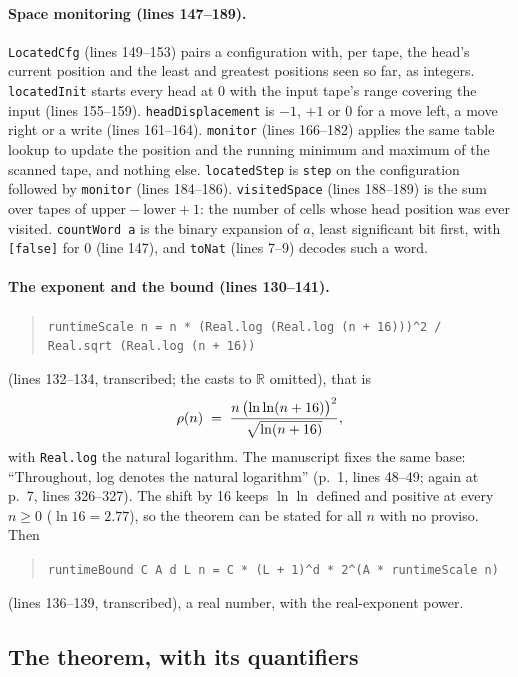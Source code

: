 \paragraph{Space monitoring (lines 147--189).}
\texttt{LocatedCfg} (lines 149--153) pairs a configuration with, per tape,
the head's current position and the least and greatest positions seen so
far, as integers. \texttt{locatedInit} starts every head at 0 with the
input tape's range covering the input (lines 155--159).
\texttt{headDisplacement} is \(-1\), \(+1\) or \(0\) for a move left, a
move right or a write (lines 161--164). \texttt{monitor} (lines 166--182)
applies the same table lookup to update the position and the running
minimum and maximum of the scanned tape, and nothing else.
\texttt{locatedStep} is \texttt{step} on the configuration followed by
\texttt{monitor} (lines 184--186). \texttt{visitedSpace} (lines 188--189)
is the sum over tapes of \(\mathrm{upper} - \mathrm{lower} + 1\): the
number of cells whose head position was ever visited. \texttt{countWord a}
is the binary expansion of \(a\), least significant bit first, with
\texttt{[false]} for \(0\) (line 147), and \texttt{toNat} (lines 7--9)
decodes such a word.

\paragraph{The exponent and the bound (lines 130--141).}
\begin{quote}\small
\texttt{runtimeScale n = n * (Real.log (Real.log (n + 16)))\^{}2 /}\\
\texttt{\quad Real.sqrt (Real.log (n + 16))}
\end{quote}
(lines 132--134, transcribed; the casts to \(\mathbb{R}\) omitted), that is
\[
  \rho(n) \;=\; \frac{n\,\bigl(\ln\ln(n+16)\bigr)^2}{\sqrt{\ln(n+16)}},
\]
with \texttt{Real.log} the natural logarithm. The manuscript fixes the
same base: ``Throughout, log denotes the natural logarithm'' (p.~1, lines
48--49; again at p.~7, lines 326--327). The shift by 16 keeps
\(\ln\ln\) defined and positive at every \(n \ge 0\) (\(\ln 16 = 2.77\)),
so the theorem can be stated for all \(n\) with no proviso. Then
\begin{quote}
\texttt{runtimeBound C A d L n = C * (L + 1)\^{}d * 2\^{}(A * runtimeScale n)}
\end{quote}
(lines 136--139, transcribed), a real number, with the real-exponent
power.

\subsection{The theorem, with its quantifiers}
\label{app:tech-theorem}

